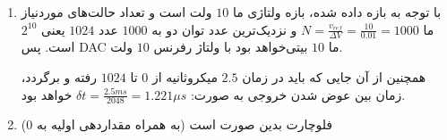 \documentclass[12pt]{article}
\begin{document}
\begin{enumerate}[label = \harfi*)]
	\item
	
	با توجه به بازه داده شده، بازه ولتاژی ما $10$ ولت است و تعداد حالت‌های موردنیاز ما
	$N = \frac{v_{ref}}{\Delta V} = \frac{10}{0.01} = 1000$
	و نزدیک‌ترین عدد توان دو به $1000$ عدد $1024$ یعنی $2^{10}$ است. پس DAC ما $10$ بیتی‌خواهد بود با ولتاژ رفرنس $10$ ولت.
	
	همچنین از آن جایی که باید در زمان $2.5$ میکروثانیه از $0$ تا $1024$ رفته و برگردد، زمان بین عوض شدن خروجی به صورت:
	$\delta t = \frac{2.5 ms}{2048} = 1.221 \mu s$
	خواهد بود.
	
	\item
	
	فلوچارت بدین صورت است (به همراه مقداردهی اولیه به $0$)
	
	
	\begin{center}
		\begin{latin}
		
	
	





\begin{tikzpicture}[x=0.75pt,y=0.75pt,yscale=-1,xscale=1]
	

\end{tikzpicture}
\end{latin}
\end{center}
\end{enumerate}
\end{document}
